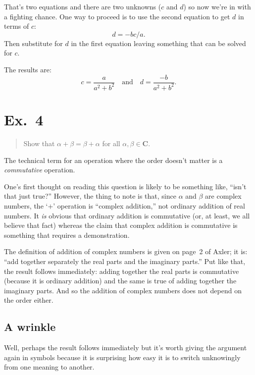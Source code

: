 \documentclass[10pt, a4paper, twocolumn]{article}
\newcommand{\set}[1]{\mathbold{#1}}
\begin{document}
That’s two equations and there are two unknowns ($c$ and $d$) so now we’re in with a fighting chance. One way to proceed is to use the second equation to get $d$ in terms of $c$:
\begin{equation*}
  d = -bc / a.
\end{equation*}
Then substitute for $d$ in the first equation leaving something that can be solved for $c$.

The results are:
\begin{equation*}
  c = \frac{a}{a^2 + b^2}
  \quad\text{and}\quad 
    d = \frac{-b}{a^2 + b^2}.
\end{equation*}

\section*{Ex.~4}
\begin{quote}
Show that $\alpha + \beta = \beta + \alpha$ for all $\alpha, \beta \in \set{C}$.
\end{quote}
The technical term for an operation where the order doesn't matter is a \emph{commutative} operation.

One's first thought on reading this question is likely to be something like, ``isn't that just true?'' However, the thing to note is that, since $\alpha$ and $\beta$ are complex numbers, the `$+$' operation is ``complex addition,'' not ordinary addition of real numbers. It \emph{is} obvious that ordinary addition is commutative (or, at least, we all believe that fact) whereas the claim that complex addition is commutative is something that requires a demonstration.

The definition of addition of complex numbers is given on page~2 of
Axler; it is: ``add together separately the real parts and the imaginary
parts.'' Put like that, the result follows immediately: adding together
the real parts is commutative (because it is ordinary addition) and the
same is true of adding together the imaginary parts. And so the addition
of complex numbers does not depend on the order either.

\subsection*{A wrinkle}

Well, perhaps the result follows immediately but it's worth giving the
argument again in symbols because it is surprising how easy it is to switch unknowingly from one meaning to another.
\end{document}
